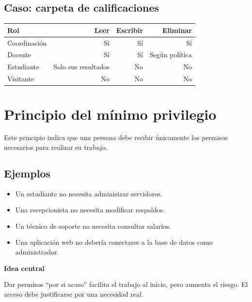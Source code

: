 \documentclass[
  spanish,
  letterpaper,
]{scrbook}
\newcounter{none} %
\providecommand{\tightlist}{%
  \setlength{\itemsep}{0pt}\setlength{\parskip}{0pt}}
\begin{document}
\section{Caso: carpeta de
calificaciones}\label{caso-carpeta-de-calificaciones}

{\def\LTcaptype{none} %
\begin{longtable}[]{@{}lrrr@{}}
\toprule\noalign{}
Rol & Leer & Escribir & Eliminar \\
\midrule\noalign{}
\endhead
\bottomrule\noalign{}
\endlastfoot
Coordinación & Sí & Sí & Sí \\
Docente & Sí & Sí & Según política \\
Estudiante & Solo sus resultados & No & No \\
Visitante & No & No & No \\
\end{longtable}
}


\chapter{Principio del mínimo
privilegio}\label{principio-del-muxednimo-privilegio}

Este principio indica que una persona debe recibir únicamente los
permisos necesarios para realizar su trabajo.

\section{Ejemplos}\label{ejemplos}

\begin{itemize}
\tightlist
\item
  Un estudiante no necesita administrar servidores.
\item
  Una recepcionista no necesita modificar respaldos.
\item
  Un técnico de soporte no necesita consultar salarios.
\item
  Una aplicación web no debería conectarse a la base de datos como
  administrador.
\end{itemize}

\begin{tcolorbox}[enhanced jigsaw, arc=.35mm, bottomrule=.15mm, breakable, colback=white, colframe=quarto-callout-important-color-frame, left=2mm, leftrule=.75mm, opacityback=0, rightrule=.15mm, toprule=.15mm]
\begin{minipage}[t]{5.5mm}
\textcolor{quarto-callout-important-color}{\faExclamation}
\end{minipage}%
\begin{minipage}[t]{\textwidth - 5.5mm}

\vspace{-3mm}\textbf{Idea central}\vspace{3mm}

Dar permisos ``por si acaso'' facilita el trabajo al inicio, pero
aumenta el riesgo. El acceso debe justificarse por una necesidad real.

\end{minipage}%
\end{tcolorbox}
\end{document}
